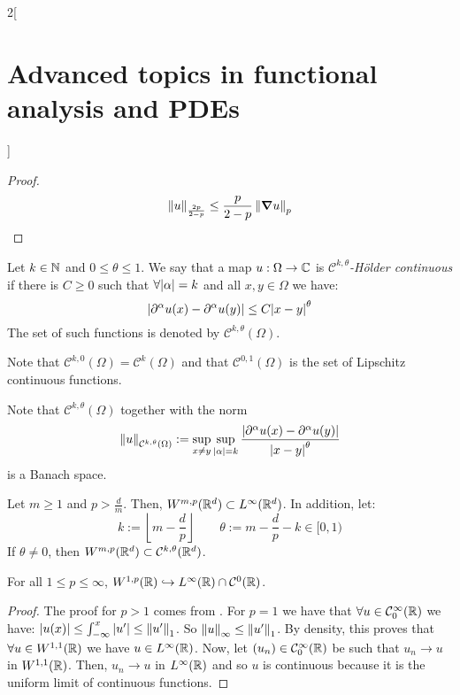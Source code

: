\documentclass[../../../main_math.tex]{subfiles}
\begin{document}
\begin{multicols}{2}[\section{Advanced topics in functional analysis and PDEs}]
\begin{proof}
$$      \left\|u\right\|_{\frac{2p}{2-p}}\leq \frac{p}{2-p}\left\|\grad u\right\|_p
    $$
  \end{proof}
  \begin{definition}
    Let $k\in\mathbb{N}$ and $0\leq\theta\leq 1$. We say that a map $u:\Omega\to\mathbb{C}$ is \emph{$\mathcal{C}^{k,\theta}$-Hölder continuous} if there is $C\geq 0$ such that $\forall\abs{\alpha}=k$ and all $x,y\in\Omega$ we have:
    $$
      \abs{\partial^\alpha u(x)-\partial^\alpha u(y)}\leq C\abs{x-y}^\theta
    $$
    The set of such functions is denoted by $\mathcal{C}^{k,\theta}(\Omega)$.
  \end{definition}
  \begin{remark}
    Note that $\mathcal{C}^{k,0}(\Omega)=\mathcal{C}^k(\Omega)$ and that $\mathcal{C}^{0,1}(\Omega)$ is the set of Lipschitz continuous functions.
  \end{remark}
  \begin{remark}
    Note that $\mathcal{C}^{k,\theta}(\Omega)$ together with the norm
    $$
      \left\|u\right\|_{\mathcal{C}^{k,\theta}(\Omega)}:=\sup_{x\ne y}\sup_{\abs{\alpha}=k}\frac{\abs{\partial^\alpha u(x)-\partial^\alpha u(y)}}{\abs{x-y}^\theta}
    $$
    is a Banach space.
  \end{remark}
  \begin{theorem}\label{ATFAPDE:morrey_embedding}
    Let $m\geq 1$ and $p>\frac{d}{m}$. Then, $W^{m,p}(\mathbb{R}^d)\subset L^\infty(\mathbb{R}^d)$. In addition, let:
    $$
      k:=\left\lfloor m-\frac{d}{p}\right\rfloor\qquad\theta:=m-\frac{d}{p}-k\in [0,1)
    $$
    If $\theta\ne 0$, then $W^{m,p}(\mathbb{R}^d)\subset \mathcal{C}^{k,\theta}(\mathbb{R}^d)$.
  \end{theorem}
  \begin{theorem}
    For all $1\leq p\leq \infty$, $W^{1,p}(\mathbb{R})\hookrightarrow L^\infty(\mathbb{R})\cap \mathcal{C}^{0}(\mathbb{R})$.
  \end{theorem}
  \begin{proof}
    The proof for $p>1$ comes from . For $p=1$ we have that $\forall u\in \mathcal{C}_0^\infty(\mathbb{R})$ we have:
    $\abs{u(x)}\leq \int_{-\infty}^x{\abs{u'}}\leq \left\|u'\right\|_1$. So $\left\|u\right\|_\infty\leq \left\|u'\right\|_1$. By density, this proves that $\forall u\in W^{1,1}(\mathbb{R})$ we have $u\in L^\infty(\mathbb{R})$. Now, let $(u_n)\in \mathcal{C}_0^\infty(\mathbb{R})$ be such that $u_n\to u$ in $W^{1,1}(\mathbb{R})$. Then, $u_n\to u$ in $L^\infty(\mathbb{R})$ and so $u$ is continuous because it is the uniform limit of continuous functions.
  \end{proof}

\end{multicols}
\end{document}
